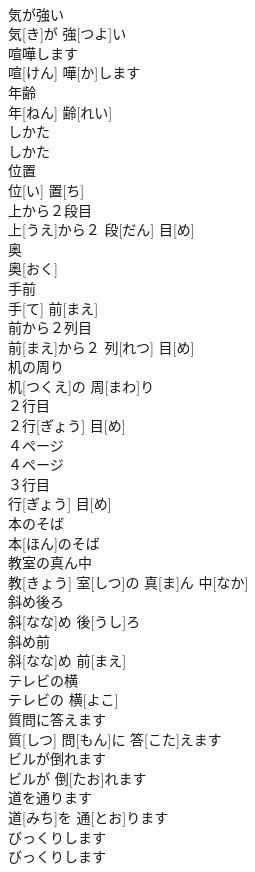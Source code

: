 \documentclass[8pt]{extreport}
\begin{document}
\begin{CJK}{UTF8}{min}
\\	気が強い	
\\	気[き]が 強[つよ]い		
\\	喧嘩します	
\\	喧[けん] 嘩[か]します		
\\	年齢	
\\	年[ねん] 齢[れい]		
\\	しかた	
\\	しかた		
\\	位置	
\\	位[い] 置[ち]		
\\	上から２段目	
\\	上[うえ]から２ 段[だん] 目[め]		
\\	奥	
\\	奥[おく]		
\\	手前	
\\	手[て] 前[まえ]		
\\	前から２列目	
\\	前[まえ]から２ 列[れつ] 目[め]		
\\	机の周り	
\\	机[つくえ]の 周[まわ]り		
\\	２行目	
\\	２行[ぎょう] 目[め]		
\\	４ページ	
\\	４ページ		
\\	３行目	
\\	行[ぎょう] 目[め]		
\\	本のそば	
\\	本[ほん]のそば		
\\	教室の真ん中	
\\	教[きょう] 室[しつ]の 真[ま]ん 中[なか]		
\\	斜め後ろ	
\\	斜[なな]め 後[うし]ろ		
\\	斜め前	
\\	斜[なな]め 前[まえ]		
\\	テレビの横	
\\	テレビの 横[よこ]		
\\	質問に答えます	
\\	質[しつ] 問[もん]に 答[こた]えます		
\\	ビルが倒れます	
\\	ビルが 倒[たお]れます		
\\	道を通ります	
\\	道[みち]を 通[とお]ります		
\\	びっくりします	
\\	びっくりします		

\end{CJK}
\end{document}
